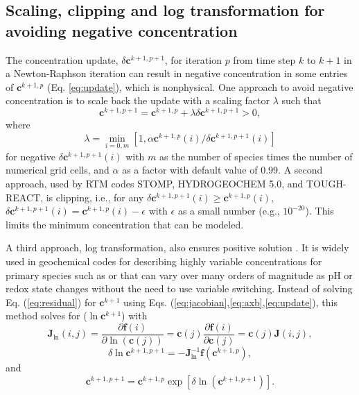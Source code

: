 \documentclass[gmd, manuscript]{copernicus}
\begin{document}
\subsection{Scaling, clipping and log transformation for avoiding negative concentration}
The concentration update, $\delta\mathbf{c}^{k+1,p+1}$, for iteration $p$ from time step $k$ to $k+1$ in a Newton-Raphson iteration can result in negative
concentration in some entries of $\mathbf{c}^{k+1,p}$ (Eq. \ref{eq:update}),
which is nonphysical. One approach to avoid negative concentration is to scale
back the update with a scaling factor $\lambda$ \citep{Bethke2007,Hammond2003}
such that 
\begin{equation}
\mathbf{c}^{k+1,p+1}=\mathbf{c}^{k+1,p}+\lambda \delta \mathbf{c}^{k+1,p+1} > 0,
\label{eq:lambda}
\end{equation}
where
\begin{equation}
\lambda = \min_{i=0,m}\left[1, \alpha {\mathbf{c}^{k+1,p}(i)}/{\delta \mathbf{c}^{k+1,p+1} (i)}\right]
\label{eq:alpha}
\end{equation}
for negative $\delta \mathbf{c}^{k+1,p+1} (i)$ with $m$ as the number of species
times the number of numerical grid cells, and $\alpha$ as a factor with default value of 0.99. 
A second approach, used by RTM codes STOMP, HYDROGEOCHEM 5.0,
and TOUGH-REACT, is clipping, i.e., for any $\delta \mathbf{c}^{k+1,p+1}(i)
\geq \mathbf{c}^{k+1,p}(i)$, $\delta \mathbf{c}^{k+1,p+1}(i) =
\mathbf{c}^{k+1,p}(i) - \epsilon$  with $\epsilon$ as a small number (e.g.,
$10^{-20}$). This limits the minimum concentration that can be modeled. 

A third approach, log transformation, also ensures positive solution
\citep{Bethke2007,Hammond2003,Parkhurst1999}. It is widely used in geochemical
codes for describing highly variable concentrations for primary species such as
 or  that can vary over many orders of magnitude as pH or
redox state changes without the need to use variable switching. Instead of
solving Eq. (\ref{eq:residual}) for $\mathbf{c}^{k+1}$ using Eqs.
(\ref{eq:jacobian},\ref{eq:axb},\ref{eq:update}), this method solves for
($\ln\mathbf{c}^{k+1}$) \citep{Hammond2003} with 
\begin{equation}
\mathbf{J}_{\ln}(i,j)=\frac{\partial \mathbf{f}(i)}{\partial
\ln(\mathbf{c}(j))} = \mathbf{c}(j) \frac{\partial
\mathbf{f}(i)}{\partial \mathbf{c}(j)} = \mathbf{c}(j) \mathbf{J}(i,j),
\label{eq:jacobianlt}
\end{equation}
\begin{equation}
\delta \ln\mathbf{c}^{k+1,p+1}= -\mathbf{J}^{-1}_{\ln} \mathbf{f} (\mathbf{c}^{k+1,p}),
\label{eq:axblt}
\end{equation}
and
\begin{equation}
\mathbf{c}^{k+1,p+1}=\mathbf{c}^{k+1,p}\exp\left[\delta
\ln(\mathbf{c}^{k+1,p+1})\right].
\label{eq:updatelt}	
\end{equation}
\end{document}

